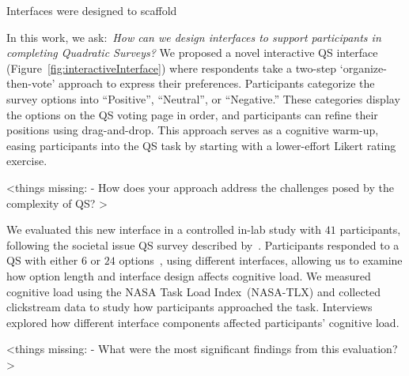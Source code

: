 
Interfaces were designed to scaffold 


In this work, we ask:~\textit{How can we design interfaces to support participants in completing Quadratic Surveys?}
We proposed a novel interactive QS interface (Figure~\ref{fig:interactiveInterface}) where respondents take a two-step `organize-then-vote' approach to express their preferences. 
Participants categorize the survey options into “Positive”, “Neutral”, or “Negative.” 
These categories display the options on the QS voting page in order, and participants can refine their positions using drag-and-drop. 
This approach serves as a cognitive warm-up, easing participants into the QS task by starting with a lower-effort Likert rating exercise.

<things missing:
- How does your approach address the challenges posed by the complexity of QS?
>


We evaluated this new interface in a controlled in-lab study with $41$ participants, following the societal issue QS survey described by~\textcite{chengCanShowWhat2021}. 
Participants responded to a QS with either $6$ or $24$ options~\cite{lenznerCognitiveBurdenSurvey2010, blessAskingDifficultQuestions1992}, using different interfaces, allowing us to examine how option length and interface design affects cognitive load. 
We measured cognitive load using the NASA Task Load Index~(NASA-TLX) and collected clickstream data to study how participants approached the task. 
Interviews explored how different interface components affected participants' cognitive load.

<things missing: 
- What were the most significant findings from this evaluation? 
>


